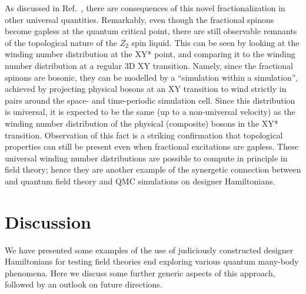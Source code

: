 \documentclass[range]{ar2e}
\begin{document}
As discussed in Ref.~\cite{XYstarQMC}, there are consequences of this novel fractionalization in other universal quantities.  Remarkably, even though the fractional spinons become gapless at the quantum critical point, there are still observable remnants of the topological nature of the $Z_2$ spin liquid.  This can be seen by looking at the winding number distribution at the XY* point, and comparing it to the winding number distribution at a regular 3D XY transition.  Namely, since the fractional spinons are bosonic, they can be modelled by a ``simulation within a simulation'', achieved by projecting physical bosons at an XY transition to wind strictly in pairs around the space- and time-periodic simulation cell.  Since this distribution is universal, it is expected to be the same (up to a non-universal velocity) as the winding number distribution of the physical (composite) bosons in the XY* transition.  Observation of this fact \cite{XYstarQMC} is a striking confirmation that topological properties can still be present even when fractional excitations are gapless.  These universal winding number distributions are possible to compute in principle in field theory; hence they are another example of the synergetic connection between and quantum field theory and QMC simulations on designer Hamiltonians.


\section{Discussion}
\label{sec:discussion}

We have presented some examples of the use of judiciously constructed designer Hamiltonians for testing field theories
end exploring various quantum many-body phenomena. Here we discuss some further generic aspects of this approach, followed by an 
outlook on future directions.
\end{document}
